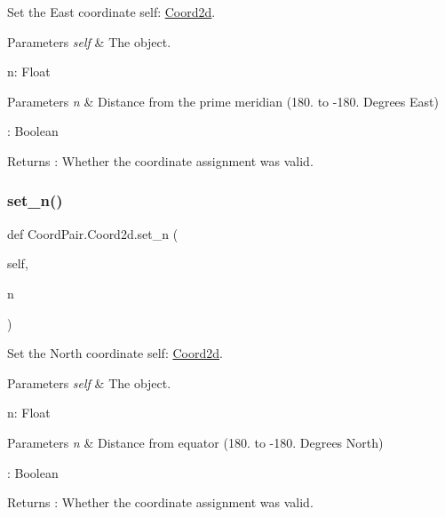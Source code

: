Set the East coordinate  self\+: \hyperlink{classCoordPair_1_1Coord2d}{Coord2d}. 


\begin{DoxyParams}{Parameters}
{\em self} & The object.\\
\hline
\end{DoxyParams}
n\+: Float 
\begin{DoxyParams}{Parameters}
{\em n} & Distance from the prime meridian (180. to -\/180. Degrees East)\\
\hline
\end{DoxyParams}
\+: Boolean \begin{DoxyReturn}{Returns}
\+: Whether the coordinate assignment was valid. 
\end{DoxyReturn}
\mbox{\label{classCoordPair_1_1Coord2d_a435a018897da527d8839db72d79147a6}} 
\subsubsection{\texorpdfstring{set\+\_\+n()}{set\_n()}}
{\footnotesize\ttfamily def Coord\+Pair.\+Coord2d.\+set\+\_\+n (\begin{DoxyParamCaption}\item[{}]{self,  }\item[{}]{n }\end{DoxyParamCaption})}



Set the North coordinate  self\+: \hyperlink{classCoordPair_1_1Coord2d}{Coord2d}. 


\begin{DoxyParams}{Parameters}
{\em self} & The object.\\
\hline
\end{DoxyParams}
n\+: Float 
\begin{DoxyParams}{Parameters}
{\em n} & Distance from equator (180. to -\/180. Degrees North)\\
\hline
\end{DoxyParams}
\+: Boolean \begin{DoxyReturn}{Returns}
\+: Whether the coordinate assignment was valid. 
\end{DoxyReturn}
\mbox{\label{classCoordPair_1_1Coord2d_ac5b1613fcd797bd5f613ad378ce3bbcb}} 
